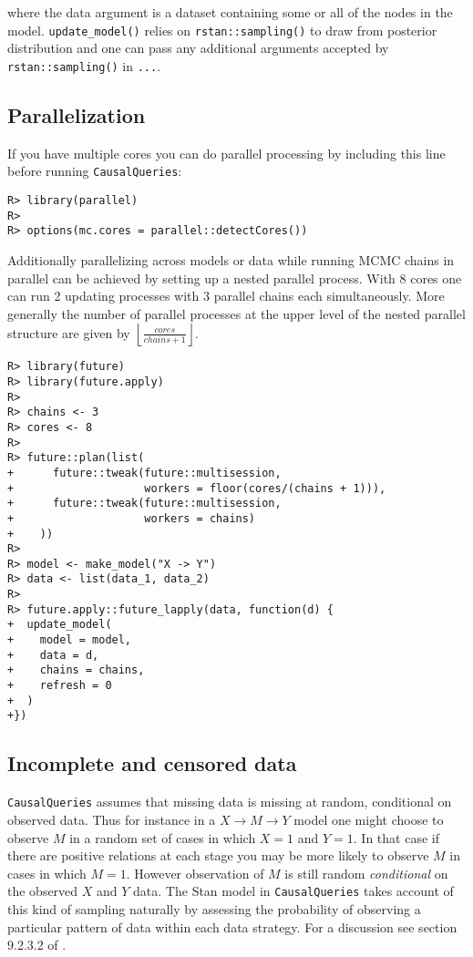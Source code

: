 \documentclass[
  11pt,
  article]{jss}
\begin{document}
where the data argument is a dataset containing some or all of the nodes
in the model. \texttt{update\_model()} relies on
\texttt{rstan::sampling()} to draw from posterior distribution and one
can pass any additional arguments accepted by \texttt{rstan::sampling()}
in \texttt{...}.

\hypertarget{parallelization}{%
\subsection{Parallelization}\label{parallelization}}

If you have multiple cores you can do parallel processing by including
this line before running \texttt{CausalQueries}:

\begin{verbatim}
R> library(parallel)
R> 
R> options(mc.cores = parallel::detectCores())
\end{verbatim}

Additionally parallelizing across models or data while running MCMC
chains in parallel can be achieved by setting up a nested parallel
process. With 8 cores one can run 2 updating processes with 3 parallel
chains each simultaneously. More generally the number of parallel
processes at the upper level of the nested parallel structure are given
by \(\left \lfloor \frac{cores}{chains + 1} \right \rfloor\).

\begin{verbatim}
R> library(future)
R> library(future.apply)
R> 
R> chains <- 3
R> cores <- 8
R> 
R> future::plan(list(
+      future::tweak(future::multisession, 
+                    workers = floor(cores/(chains + 1))),
+      future::tweak(future::multisession, 
+                    workers = chains)
+    ))
R> 
R> model <- make_model("X -> Y")
R> data <- list(data_1, data_2)
R> 
R> future.apply::future_lapply(data, function(d) {
+  update_model(
+    model = model,
+    data = d,
+    chains = chains,
+    refresh = 0
+  )
+})
\end{verbatim}

\hypertarget{incomplete-and-censored-data}{%
\subsection{Incomplete and censored
data}\label{incomplete-and-censored-data}}

\texttt{CausalQueries} assumes that missing data is missing at random,
conditional on observed data. Thus for instance in a
\(X \rightarrow M \rightarrow Y\) model one might choose to observe
\(M\) in a random set of cases in which \(X=1\) and \(Y=1\). In that
case if there are positive relations at each stage you may be more
likely to observe \(M\) in cases in which \(M=1\). However observation
of \(M\) is still random \emph{conditional} on the observed \(X\) and
\(Y\) data. The Stan model in \texttt{CausalQueries} takes account of
this kind of sampling naturally by assessing the probability of
observing a particular pattern of data within each data strategy. For a
discussion see section 9.2.3.2 of \citet{humphreys_integrated_2023}.
\end{document}
